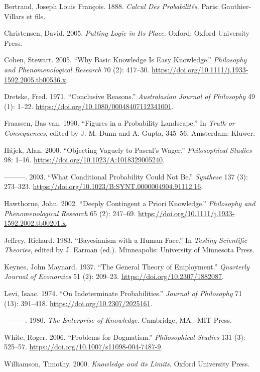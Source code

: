 \documentclass[
  11pt,
  letterpaper,
  DIV=11,
  numbers=noendperiod,
  oneside]{scrartcl}
\newlength{\cslhangindent}
\newenvironment{CSLReferences}[2] %
 {\begin{list}{}{%
  \setlength{\itemindent}{0pt}
  \setlength{\leftmargin}{0pt}
  \setlength{\parsep}{0pt}
  \ifodd #1
   \setlength{\leftmargin}{\cslhangindent}
   \setlength{\itemindent}{-1\cslhangindent}
  \fi
  \setlength{\itemsep}{#2\baselineskip}}}
 {\end{list}}
\begin{document}
\label{refs}
\begin{CSLReferences}{1}{0}
Bertrand, Joseph Louis François. 1888. \emph{Calcul Des Probabilités}.
Paris: Gauthier-Villars et fils.

Christensen, David. 2005. \emph{Putting Logic in Its Place}. Oxford:
Oxford University Press.

Cohen, Stewart. 2005. {``Why Basic Knowledge Is Easy Knowledge.''}
\emph{Philosophy and Phenomenological Research} 70 (2): 417--30.
\url{https://doi.org/10.1111/j.1933-1592.2005.tb00536.x}.

Dretske, Fred. 1971. {``Conclusive Reasons.''} \emph{Australasian
Journal of Philosophy} 49 (1): 1--22.
\url{https://doi.org/10.1080/00048407112341001}.

Fraassen, Bas van. 1990. {``Figures in a Probability Landscape.''} In
\emph{Truth or Consequences}, edited by J. M. Dunn and A. Gupta,
345--56. Amsterdam: Kluwer.

Hájek, Alan. 2000. {``Objecting Vaguely to Pascal's Wager.''}
\emph{Philosophical Studies} 98: 1--16.
\url{https://doi.org/10.1023/A:1018329005240}.

---------. 2003. {``What Conditional Probability Could Not Be.''}
\emph{Synthese} 137 (3): 273--323.
\url{https://doi.org/10.1023/B:SYNT.0000004904.91112.16}.

Hawthorne, John. 2002. {``Deeply Contingent a Priori Knowledge.''}
\emph{Philosophy and Phenomenological Research} 65 (2): 247--69.
\url{https://doi.org/10.1111/j.1933-1592.2002.tb00201.x}.

Jeffrey, Richard. 1983. {``Bayesianism with a Human Face.''} In
\emph{Testing Scientific Theories}, edited by J. Earman (ed.).
Minneapolis: University of Minnesota Press.

Keynes, John Maynard. 1937. {``The General Theory of Employment.''}
\emph{Quarterly Journal of Economics} 51 (2): 209--23.
\url{https://doi.org/10.2307/1882087}.

Levi, Isaac. 1974. {``On Indeterminate Probabilities.''} \emph{Journal
of Philosophy} 71 (13): 391--418. \url{https://doi.org/10.2307/2025161}.

---------. 1980. \emph{The Enterprise of Knowledge}. Cambridge, MA.: MIT
Press.

White, Roger. 2006. {``Problems for Dogmatism.''} \emph{Philosophical
Studies} 131 (3): 525--57.
\url{https://doi.org/10.1007/s11098-004-7487-9}.

Williamson, Timothy. 2000. \emph{{Knowledge and its Limits}}. Oxford
University Press.

\end{CSLReferences}
\end{document}
